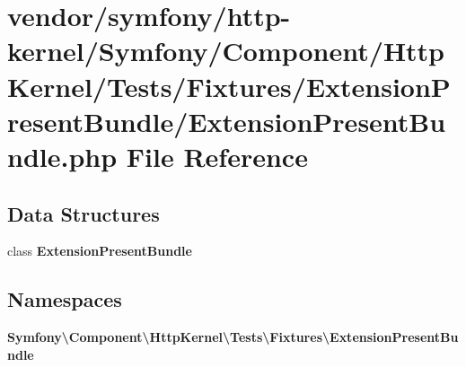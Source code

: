 \section{vendor/symfony/http-\/kernel/\+Symfony/\+Component/\+Http\+Kernel/\+Tests/\+Fixtures/\+Extension\+Present\+Bundle/\+Extension\+Present\+Bundle.php File Reference}
\label{_extension_present_bundle_8php}
\subsection*{Data Structures}
\begin{DoxyCompactItemize}
\item 
class {\bf Extension\+Present\+Bundle}
\end{DoxyCompactItemize}
\subsection*{Namespaces}
\begin{DoxyCompactItemize}
\item 
 {\bf Symfony\textbackslash{}\+Component\textbackslash{}\+Http\+Kernel\textbackslash{}\+Tests\textbackslash{}\+Fixtures\textbackslash{}\+Extension\+Present\+Bundle}
\end{DoxyCompactItemize}
